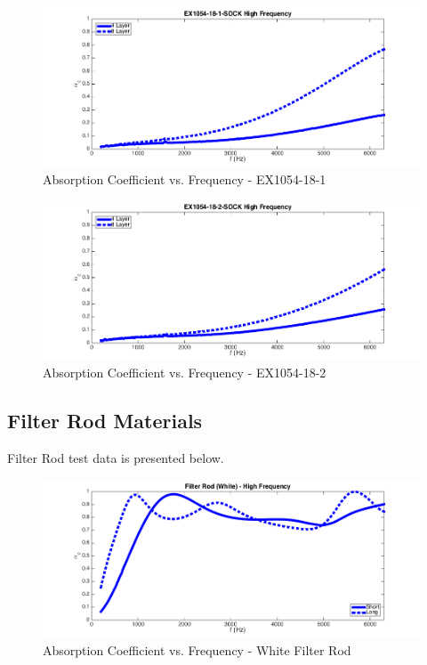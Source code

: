 \begin{figure}[hbtp]
    \centering
    \includegraphics[width=1\textwidth]{Chapter-4/figs/AfigSOCK18-1}
    \caption{Absorption Coefficient vs. Frequency - EX1054-18-1}
    \label{fig:AfigSOCK18-1}
\end{figure}

\begin{figure}[hbtp]
    \centering
    \includegraphics[width=1\textwidth]{Chapter-4/figs/AfigSOCK18-2}
    \caption{Absorption Coefficient vs. Frequency - EX1054-18-2}
    \label{fig:AfigSOCK18-2}
\end{figure}
\clearpage




\subsection{Filter Rod Materials}
Filter Rod test data is presented below.

\begin{figure}[hbtp]
    \centering
    \includegraphics[width=1\textwidth]{Chapter-4/figs/Afigfilterrodwhite}
    \caption{Absorption Coefficient vs. Frequency - White Filter Rod}
    \label{fig:Afigfilterrodwhite}
\end{figure}


